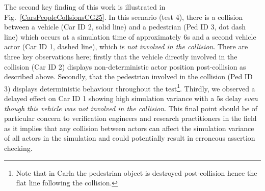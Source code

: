 \documentclass[letterpaper, 10 pt, journal, twoside]{IEEEtran}
\begin{document}
The second key finding of this work is illustrated in Fig.~\ref{CarsPeopleCollsionsCG25}. In this scenario (test 4), there is a collision between a vehicle (Car ID 2, solid line) and a pedestrian (Ped ID 3, dot dash line) which occurs at a simulation time of approximately $6$s and a second vehicle actor (Car ID 1, dashed line), which is \textit{not involved in the collision}. There are three key observations here; firstly that the vehicle directly involved in the collision (Car ID 2) displays non-deterministic actor position post-collision as described above. Secondly, that the pedestrian involved in the collision (Ped ID 3) displays deterministic behaviour throughout the test\footnote{Note that in Carla the pedestrian object is destroyed post-collision hence the flat line following the collision.}. Thirdly, we observed a delayed effect on Car ID 1 showing high simulation variance with a $5$s delay \textit{even though this vehicle was not involved in the collision}. This final point should be of particular concern to verification engineers and research practitioners in the field as it implies that any collision between actors can affect the simulation variance of all actors in the simulation and could potentially result in  erroneous assertion checking.





\end{document}
